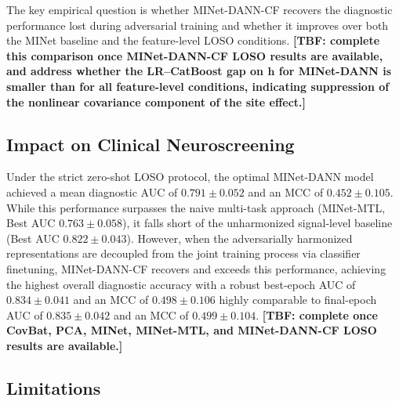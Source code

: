 \documentclass[preprint,12pt]{elsarticle}
\begin{document}
The key empirical question is whether MINet-DANN-CF recovers the
diagnostic performance lost during adversarial training and whether
it improves over both the MINet baseline and the feature-level LOSO
conditions.
\textbf{[TBF: complete this comparison once MINet-DANN-CF LOSO
results are available, and address whether the LR--CatBoost gap on
$\mathbf{h}$ for MINet-DANN is smaller than for all feature-level
conditions, indicating suppression of the nonlinear covariance
component of the site effect.]}
\subsection{Impact on Clinical Neuroscreening}
\label{subsec:disc_clinical}


Under the strict zero-shot LOSO protocol, the optimal MINet-DANN model achieved a mean diagnostic AUC of $0.791 \pm 0.052$ and an MCC of $0.452 \pm 0.105$. While this performance surpasses the naive multi-task approach (MINet-MTL, Best AUC $0.763 \pm 0.058$), it falls short of the unharmonized signal-level baseline (Best AUC $0.822 \pm 0.043$). However, when the adversarially harmonized representations are decoupled from the joint training process via classifier finetuning, MINet-DANN-CF recovers and exceeds this performance, achieving the highest overall diagnostic accuracy with a robust best-epoch AUC of $0.834 \pm 0.041$ and an MCC of $0.498 \pm 0.106$ highly comparable to final-epoch AUC of $0.835 \pm 0.042$ and an MCC of $0.499 \pm 0.104$.
\textbf{[TBF: complete once CovBat, PCA, MINet, MINet-MTL, and
MINet-DANN-CF LOSO results are available.]}

\subsection{Limitations}
\label{subsec:limitations}
\end{document}
